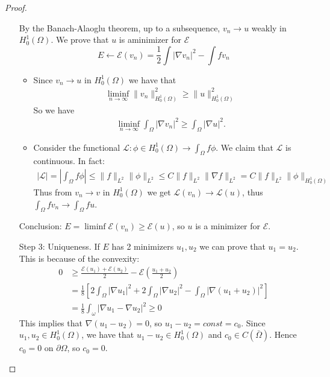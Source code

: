 \documentclass{report}
\theoremstyle{tommy}
\begin{document}
\begin{proof}
\begin{itemize}
      By the Banach-Alaoglu theorem, up to a subsequence, \(v_n \to u\) weakly in \(H_0^1(\Omega)\). We prove that \(u\) is aminimizer for \(\mathcal{E}\)
      \[E \longleftarrow \mathcal{E}(v_n) = \frac{1}{2} \int |\nabla v_n|^2 - \int f v_n\]
      \begin{itemize}
        \item Since \(v_n \to u\) in \(H_0^1(\Omega)\) we have that 
        \begin{align*}
          \liminf_{n \to \infty} \|v_n\|^2_{H_0^1(\Omega)} \ge \|u\|^2_{H_0^1(\Omega)}
        \end{align*}
        So we have 
        \begin{align*}
          \liminf_{n \to \infty} \int_\Omega|\nabla v_n|^2 \ge \int_\Omega |\nabla u|^2.
        \end{align*}
        \item Consider the functional \(\mathcal{L}: \phi \in H_0^1(\Omega) \to \int_\Omega f \phi\). We claim that \(\mathcal{L}\) is continuous. In fact:
        \begin{align*}
          |\mathcal{L}| = \left| \int_\Omega f \phi \right| \le \|f\|_{L^2}\|\phi\|_{L^2} \le C\|f\|_{L^2}\|\nabla f\|_{L^2} = C \|f\|_{L^2}\|\phi\|_{H_0^1(\Omega)}
        \end{align*}
        Thus from \(v_n \to v\) in \(H_0^1(\Omega)\) we get \(\mathcal{L}(v_n) \to \mathcal{L}(u)\), thus \(\int_\Omega f v_n \to \int_\Omega f u\).
      \end{itemize}
      Conclusion: \(E = \liminf \mathcal{E}(v_n) \ge \mathcal{E}(u)\), so \(u\) is a minimizer for \(\mathcal{E}\).
      \item[Step 3:] Uniqueness. If \(E\) has 2 minimizers \(u_1, u_2\) we can prove that \(u_1 = u_2\). This is because of the convexity:
      \begin{align*}
        0 &\ge \frac{\mathcal{E}(u_1) + \mathcal{E}(u_2)}{2} - \mathcal{E}\left(\frac{u_1 + u_2}{2}\right) \\
        &= \frac{1}{8} \left[2 \int_\Omega |\nabla u_1|^2 + 2 \int_\Omega |\nabla u_2|^2 - \int_\Omega |\nabla (u_1 + u_2)|^2\right] \\
        &= \frac{1}{8} \int_\omega|\nabla u_1 - \nabla u_2|^2 \ge 0
      \end{align*} 
      This implies that \(\nabla(u_1 - u_2) = 0\), so \(u_1 - u_2 = const = c_0\). Since \(u_1, u_2 \in H_0^1(\Omega)\), we have that \(u_1 - u_2 \in H_0^1(\Omega)\) and \(c_0 \in C(\bar \Omega)\). Hence \(c_0 = 0\) on \(\partial \Omega\), so \(c_0 = 0\). \qedhere
    \end{itemize}
  \end{proof}
\end{document}
